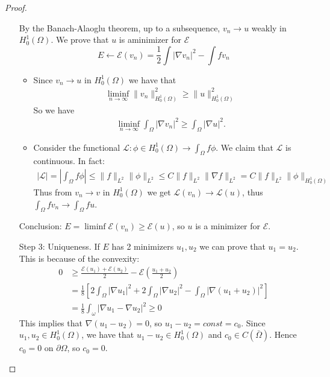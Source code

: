 \documentclass{report}
\theoremstyle{tommy}
\begin{document}
\begin{proof}
\begin{itemize}
      By the Banach-Alaoglu theorem, up to a subsequence, \(v_n \to u\) weakly in \(H_0^1(\Omega)\). We prove that \(u\) is aminimizer for \(\mathcal{E}\)
      \[E \longleftarrow \mathcal{E}(v_n) = \frac{1}{2} \int |\nabla v_n|^2 - \int f v_n\]
      \begin{itemize}
        \item Since \(v_n \to u\) in \(H_0^1(\Omega)\) we have that 
        \begin{align*}
          \liminf_{n \to \infty} \|v_n\|^2_{H_0^1(\Omega)} \ge \|u\|^2_{H_0^1(\Omega)}
        \end{align*}
        So we have 
        \begin{align*}
          \liminf_{n \to \infty} \int_\Omega|\nabla v_n|^2 \ge \int_\Omega |\nabla u|^2.
        \end{align*}
        \item Consider the functional \(\mathcal{L}: \phi \in H_0^1(\Omega) \to \int_\Omega f \phi\). We claim that \(\mathcal{L}\) is continuous. In fact:
        \begin{align*}
          |\mathcal{L}| = \left| \int_\Omega f \phi \right| \le \|f\|_{L^2}\|\phi\|_{L^2} \le C\|f\|_{L^2}\|\nabla f\|_{L^2} = C \|f\|_{L^2}\|\phi\|_{H_0^1(\Omega)}
        \end{align*}
        Thus from \(v_n \to v\) in \(H_0^1(\Omega)\) we get \(\mathcal{L}(v_n) \to \mathcal{L}(u)\), thus \(\int_\Omega f v_n \to \int_\Omega f u\).
      \end{itemize}
      Conclusion: \(E = \liminf \mathcal{E}(v_n) \ge \mathcal{E}(u)\), so \(u\) is a minimizer for \(\mathcal{E}\).
      \item[Step 3:] Uniqueness. If \(E\) has 2 minimizers \(u_1, u_2\) we can prove that \(u_1 = u_2\). This is because of the convexity:
      \begin{align*}
        0 &\ge \frac{\mathcal{E}(u_1) + \mathcal{E}(u_2)}{2} - \mathcal{E}\left(\frac{u_1 + u_2}{2}\right) \\
        &= \frac{1}{8} \left[2 \int_\Omega |\nabla u_1|^2 + 2 \int_\Omega |\nabla u_2|^2 - \int_\Omega |\nabla (u_1 + u_2)|^2\right] \\
        &= \frac{1}{8} \int_\omega|\nabla u_1 - \nabla u_2|^2 \ge 0
      \end{align*} 
      This implies that \(\nabla(u_1 - u_2) = 0\), so \(u_1 - u_2 = const = c_0\). Since \(u_1, u_2 \in H_0^1(\Omega)\), we have that \(u_1 - u_2 \in H_0^1(\Omega)\) and \(c_0 \in C(\bar \Omega)\). Hence \(c_0 = 0\) on \(\partial \Omega\), so \(c_0 = 0\). \qedhere
    \end{itemize}
  \end{proof}
\end{document}
